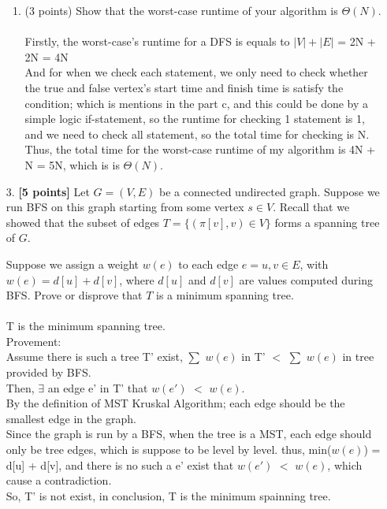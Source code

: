 \documentclass{assignment-263}
\begin{document}
\begin{enumerate}
\begin{enumerate}
    \item (3 points) Show that the worst-case runtime of your algorithm is $\Theta(N)$.\\\\
    Firstly, the worst-case's runtime for a DFS is equals to $|V|+|E|$ = 2N + 2N = 4N \\
    And for when we check each statement, we only need to check whether the true and false vertex's start time and finish time is satisfy the condition; which is mentions in the part c, and this could be done by a simple logic if-statement, so the runtime for checking 1 statement is 1, and we need to check all statement, so the total time for checking is N.\\
    Thus, the total time for the worst-case runtime of my algorithm is  4N + N = 5N, which is is $\Theta(N)$.
	\end{enumerate}

\item[3.]  \textbf{[5 points]} 
    Let $G = (V, E)$ be a connected undirected graph. Suppose we run BFS on this graph starting
    from some vertex $s \in V$. Recall that we showed that the subset of edges
    $T = \{(\pi[v], v) \in V\}$ forms a spanning tree of $G$.

    Suppose we assign a weight $w(e)$ to each edge $e = {u, v} \in E$, with 
    $w(e) = d[u] + d[v]$, where $d[u]$ and $d[v]$ are values computed during BFS. Prove or disprove that $T$ is
    a minimum spanning tree. \\\\
    T is the minimum spanning tree.\\
    Provement:\\
    Assume there is such a tree T' exist, $\sum$ $w(e)$ in T' $<$ $\sum$ $w(e)$ in tree provided by BFS.\\
    Then, $\exists$ an edge e' in T' that $w(e')$ $<$ $w(e)$.\\
    By the definition of MST Kruskal Algorithm; each edge should be the smallest edge in the graph.\\
    Since the graph is run by a BFS, when the tree is a MST, each edge should only be tree edges, which is suppose to be level by level.
    thus, min($w(e)$) = d[u] + d[v], and there is no such a e' exist that $w(e')$ $<$ $w(e)$, which cause a contradiction.\\
    So, T' is not exist, in conclusion, T is the minimum spainning tree.
    

\program


\end{enumerate}
\end{document}
